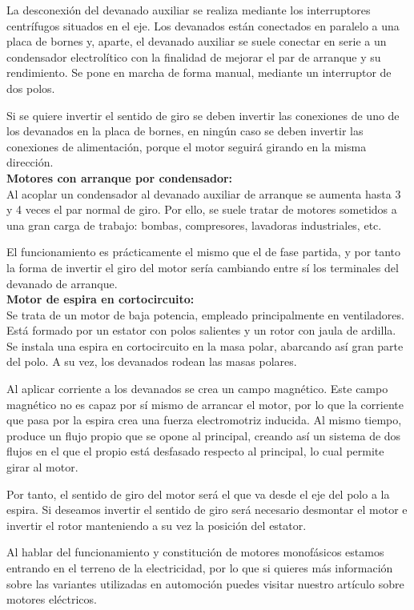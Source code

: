 \documentclass[12pt,a4paper]{article}
\begin{document}
La desconexión del devanado auxiliar se realiza mediante los interruptores centrífugos situados en el eje. Los devanados están conectados en paralelo a una placa de bornes y, aparte, el devanado auxiliar se suele conectar en serie a un condensador electrolítico con la finalidad de mejorar el par de arranque y su rendimiento. Se pone en marcha de forma manual, mediante un interruptor de dos polos.

Si se quiere invertir el sentido de giro se deben invertir las conexiones de uno de los devanados en la placa de bornes, en ningún caso se deben invertir las conexiones de alimentación, porque el motor seguirá girando en la misma dirección.\\

\textbf{Motores con arranque por condensador:}\\
Al acoplar un condensador al devanado auxiliar de arranque se aumenta hasta 3 y 4 veces el par normal de giro. Por ello, se suele tratar de motores sometidos a una gran carga de trabajo: bombas, compresores, lavadoras industriales, etc.

El funcionamiento es prácticamente el mismo que el de fase partida, y por tanto la forma de invertir el giro del motor sería cambiando entre sí los terminales del devanado de arranque.\\

\textbf{Motor de espira en cortocircuito:}\\
Se trata de un motor de baja potencia, empleado principalmente en ventiladores. Está formado por un estator con polos salientes y un rotor con jaula de ardilla. Se instala una espira en cortocircuito en la masa polar, abarcando así gran parte del polo. A su vez, los devanados rodean las masas polares.

Al aplicar corriente a los devanados se crea un campo magnético. Este campo magnético no es capaz por sí mismo de arrancar el motor, por lo que la corriente que pasa por la espira crea una fuerza electromotriz inducida. Al mismo tiempo, produce un flujo propio que se opone al principal, creando así un sistema de dos flujos en el que el propio está desfasado respecto al principal, lo cual permite girar al motor.

Por tanto, el sentido de giro del motor será el que va desde el eje del polo a la espira. Si deseamos invertir el sentido de giro será necesario desmontar el motor e invertir el rotor manteniendo a su vez la posición del estator.

Al hablar del funcionamiento y constitución de motores monofásicos estamos entrando en el terreno de la electricidad, por lo que si quieres más información sobre las variantes utilizadas en automoción puedes visitar nuestro artículo sobre motores eléctricos.
\end{document}
